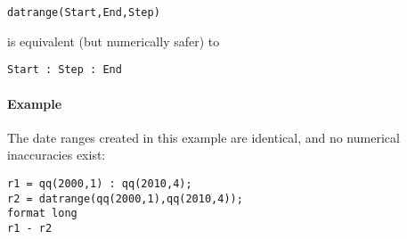\begin{verbatim}
datrange(Start,End,Step)
\end{verbatim}

is equivalent (but numerically safer) to

\begin{verbatim}
Start : Step : End
\end{verbatim}

\paragraph{Example}

The date ranges created in this example are identical, and no numerical
inaccuracies exist:

\begin{verbatim}
r1 = qq(2000,1) : qq(2010,4);
r2 = datrange(qq(2000,1),qq(2010,4));
format long
r1 - r2
\end{verbatim}


